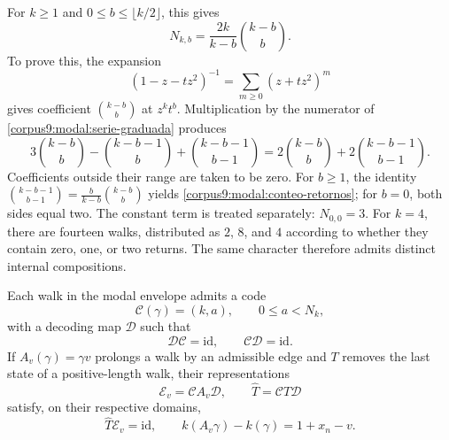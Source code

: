 For \(k\geq1\) and \(0\leq b\leq\lfloor k/2\rfloor\), this gives
\begin{equation}
 N_{k,b}=\frac{2k}{k-b}\binom{k-b}{b}.
 \label{corpus9:modal:conteo-retornos}
\end{equation}
To prove this, the expansion
\[
 (1-z-tz^2)^{-1}=\sum_{m\geq0}(z+tz^2)^m
\]
gives coefficient \(\binom{k-b}{b}\) at \(z^kt^b\).
Multiplication by the numerator of
\eqref{corpus9:modal:serie-graduada} produces
\[
 3\binom{k-b}{b}-\binom{k-b-1}{b}
   +\binom{k-b-1}{b-1}
 =2\binom{k-b}{b}+2\binom{k-b-1}{b-1}.
\]
Coefficients outside their range are taken to be zero.
For \(b\geq1\), the identity
\(\binom{k-b-1}{b-1}=\frac{b}{k-b}\binom{k-b}{b}\)
yields \eqref{corpus9:modal:conteo-retornos}; for \(b=0\),
both sides equal two. The constant term is treated separately:
\(N_{0,0}=3\). For \(k=4\), there are fourteen walks, distributed
as \(2\), \(8\), and \(4\) according to whether they contain zero,
one, or two returns. The same character therefore admits distinct
internal compositions.

\begin{proposition}
\label{corpus9:modal:recuperador}
Each walk in the modal envelope admits a code
\[
 \mathcal C(\gamma)=(k,a),\qquad 0\leq a<N_k,
\]
with a decoding map \(\mathcal D\) such that
\[
 \mathcal D\mathcal C=\mathrm{id},\qquad
 \mathcal C\mathcal D=\mathrm{id}.
\]
If \(A_v(\gamma)=\gamma v\) prolongs a walk by an admissible edge
and \(T\) removes the last state of a positive-length walk,
their representations
\[
 \mathcal E_v=\mathcal C A_v\mathcal D,\qquad
 \widehat T=\mathcal C T\mathcal D
\]
satisfy, on their respective domains,
\begin{equation}
 \widehat T\mathcal E_v=\mathrm{id},\qquad
 k(A_v\gamma)-k(\gamma)=1+x_n-v.
 \label{corpus9:modal:transporte-codigos}
\end{equation}
\end{proposition}

